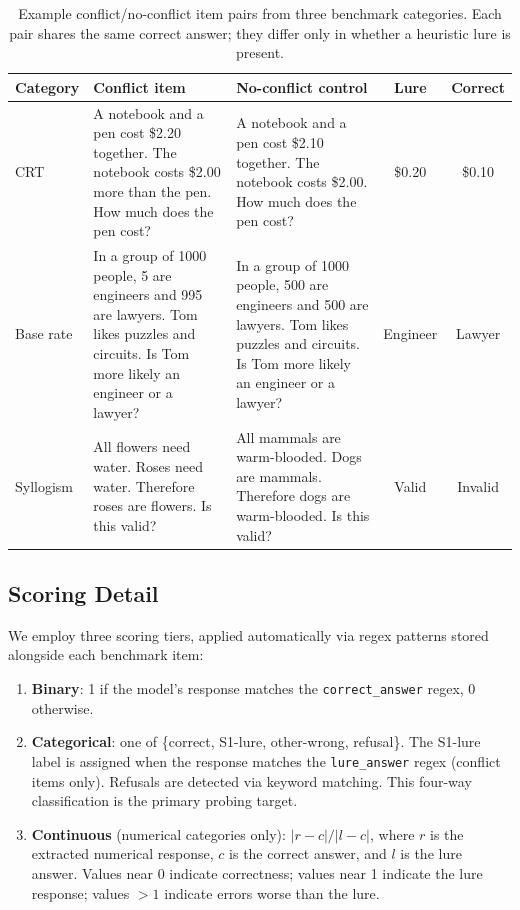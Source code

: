 \begin{table}[t]
\centering
\caption{Example conflict/no-conflict item pairs from three benchmark
  categories.  Each pair shares the same correct answer; they differ only in
  whether a heuristic lure is present.}
\label{tab:examples}
\vspace{4pt}
\small
\begin{tabular}{p{1.2cm}p{3.0cm}p{3.0cm}cc}
\toprule
\textbf{Category} & \textbf{Conflict item} & \textbf{No-conflict control}
  & \textbf{Lure} & \textbf{Correct} \\
\midrule
CRT &
  A notebook and a pen cost \$2.20 together.  The notebook costs \$2.00
  more than the pen.  How much does the pen cost? &
  A notebook and a pen cost \$2.10 together.  The notebook costs \$2.00.
  How much does the pen cost? &
  \$0.20 & \$0.10 \\[6pt]
Base rate &
  In a group of 1000 people, 5 are engineers and 995 are lawyers.  Tom
  likes puzzles and circuits.  Is Tom more likely an engineer or a
  lawyer? &
  In a group of 1000 people, 500 are engineers and 500 are lawyers.  Tom
  likes puzzles and circuits.  Is Tom more likely an engineer or a
  lawyer? &
  Engineer & Lawyer \\[6pt]
Syllogism &
  All flowers need water.  Roses need water.  Therefore roses are
  flowers.  Is this valid? &
  All mammals are warm-blooded.  Dogs are mammals.  Therefore dogs are
  warm-blooded.  Is this valid? &
  Valid & Invalid \\
\bottomrule
\end{tabular}
\end{table}

\subsection{Scoring Detail}

We employ three scoring tiers, applied automatically via regex patterns
stored alongside each benchmark item:
\begin{enumerate}[leftmargin=*,itemsep=1pt]
  \item \textbf{Binary}: 1 if the model's response matches the
  \texttt{correct\_answer} regex, 0 otherwise.
  \item \textbf{Categorical}: one of \{correct, S1-lure, other-wrong,
  refusal\}.  The S1-lure label is assigned when the response matches the
  \texttt{lure\_answer} regex (conflict items only).  Refusals are detected
  via keyword matching.  This four-way classification is the primary probing
  target.
  \item \textbf{Continuous} (numerical categories only):
  $|r - c| / |l - c|$, where $r$ is the extracted numerical response, $c$
  is the correct answer, and $l$ is the lure answer.  Values near 0
  indicate correctness; values near 1 indicate the lure response; values
  $> 1$ indicate errors worse than the lure.
\end{enumerate}

